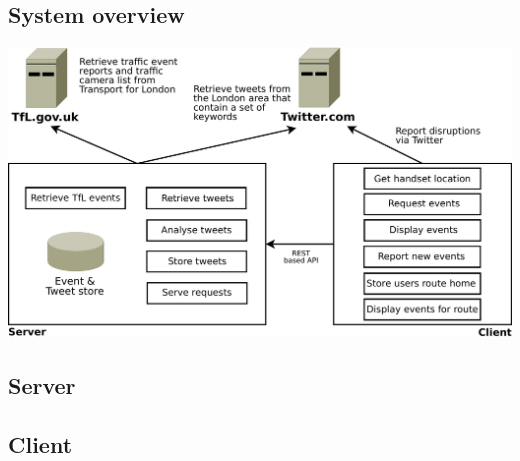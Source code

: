 
\subsection{System overview}
	\begin{center}
	\includegraphics[scale=0.37]{images/design/system_components.pdf}
	\end{center}

\subsection{Server}
  

\subsection{Client}
  

